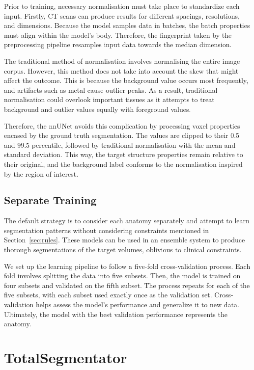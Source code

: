\documentclass[11pt,twoside]{report}
\begin{document}
Prior to training, necessary normalisation must take place to standardize each input. Firstly, CT scans can produce results for different spacings, resolutions, and dimensions. Because the model samples data in batches, the batch properties must align within the model's body. Therefore, the fingerprint taken by the preprocessing pipeline resamples input data towards the median dimension. 

The traditional method of normalisation involves normalising the entire image corpus. However, this method does not take into account the skew that might affect the outcome. This is because the background value occurs most frequently, and artifacts such as metal cause outlier peaks. As a result, traditional normalisation could overlook important tissues as it attempts to treat background and outlier values equally with foreground values.

Therefore, the nnUNet avoids this complication by processing voxel properties encased by the ground truth segmentation. The values are clipped to their 0.5 and 99.5 percentile, followed by traditional normalisation with the mean and standard deviation. This way, the target structure properties remain relative to their original, and the background label conforms to the normalisation inspired by the region of interest.

\subsection{Separate Training}\label{sec:train-nnunet}

The default strategy is to consider each anatomy separately and attempt to learn segmentation patterns without considering constraints mentioned in Section~\ref{sec:rules}. These models can be used in an ensemble system to produce thorough segmentations of the target volumes, oblivious to clinical constraints. 

We set up the learning pipeline to follow a five-fold cross-validation process. Each fold involves splitting the data into five subsets. Then, the model is trained on four subsets and validated on the fifth subset. The process repeats for each of the five subsets, with each subset used exactly once as the validation set. Cross-validation helps assess the model's performance and generalize it to new data. Ultimately, the model with the best validation performance represents the anatomy.

\section{TotalSegmentator}\label{sect:totalsegmentator}
\end{document}
